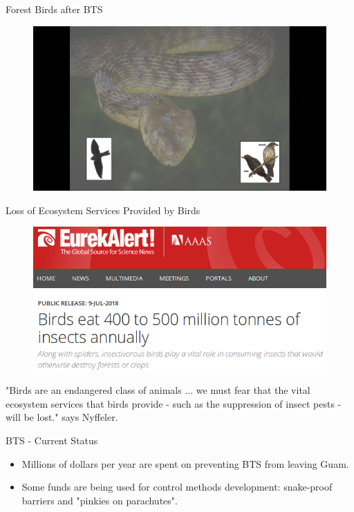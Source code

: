 \documentclass[]{beamer}
\begin{document}
\begin{frame}{Forest Birds after BTS}
	\begin{figure}
		\includegraphics[height=0.8\textheight]{birds-after-bts.png}
	\end{figure}
\end{frame}

\begin{frame}{Loss of Ecosystem Services Provided by Birds}
	\begin{figure}
		\includegraphics[height=0.5\textheight]{eureka-bird-loss.png}
	\end{figure}
"Birds are an endangered class of animals ... we must fear that the vital ecosystem services that birds provide - such as the suppression of insect pests - will be lost." says Nyffeler.
\end{frame}

\begin{frame}{BTS - Current Status}
	\begin{itemize}
		\item Millions of dollars per year are spent on preventing BTS from leaving Guam.
		\item Some funds are being used for control methods development: snake-proof barriers and "pinkies on parachutes".
	\end{itemize}
\end{frame}
\end{document}
